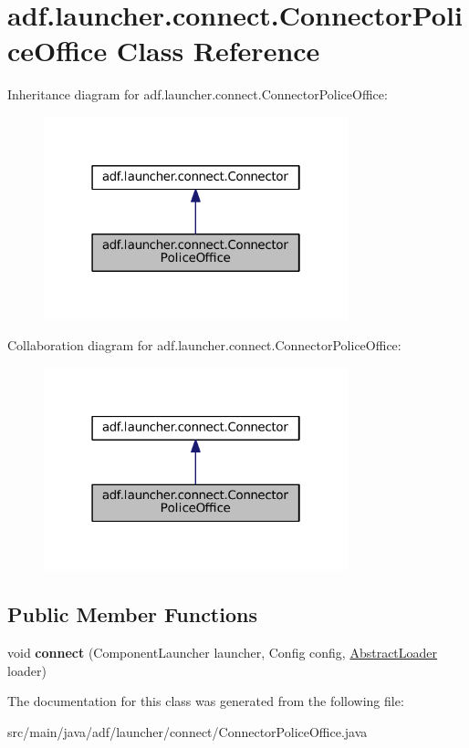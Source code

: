 \hypertarget{classadf_1_1launcher_1_1connect_1_1ConnectorPoliceOffice}{}\section{adf.\+launcher.\+connect.\+Connector\+Police\+Office Class Reference}
\label{classadf_1_1launcher_1_1connect_1_1ConnectorPoliceOffice}


Inheritance diagram for adf.\+launcher.\+connect.\+Connector\+Police\+Office\+:
\nopagebreak
\begin{figure}[H]
\begin{center}
\leavevmode
\includegraphics[width=250pt]{classadf_1_1launcher_1_1connect_1_1ConnectorPoliceOffice__inherit__graph}
\end{center}
\end{figure}


Collaboration diagram for adf.\+launcher.\+connect.\+Connector\+Police\+Office\+:
\nopagebreak
\begin{figure}[H]
\begin{center}
\leavevmode
\includegraphics[width=250pt]{classadf_1_1launcher_1_1connect_1_1ConnectorPoliceOffice__coll__graph}
\end{center}
\end{figure}
\subsection*{Public Member Functions}
\begin{DoxyCompactItemize}
\item 
\hypertarget{classadf_1_1launcher_1_1connect_1_1ConnectorPoliceOffice_a3f3c777ef185ec0b4e47678a2213310b}{}\label{classadf_1_1launcher_1_1connect_1_1ConnectorPoliceOffice_a3f3c777ef185ec0b4e47678a2213310b} 
void {\bfseries connect} (Component\+Launcher launcher, Config config, \hyperlink{classadf_1_1component_1_1AbstractLoader}{Abstract\+Loader} loader)
\end{DoxyCompactItemize}


The documentation for this class was generated from the following file\+:\begin{DoxyCompactItemize}
\item 
src/main/java/adf/launcher/connect/Connector\+Police\+Office.\+java\end{DoxyCompactItemize}
